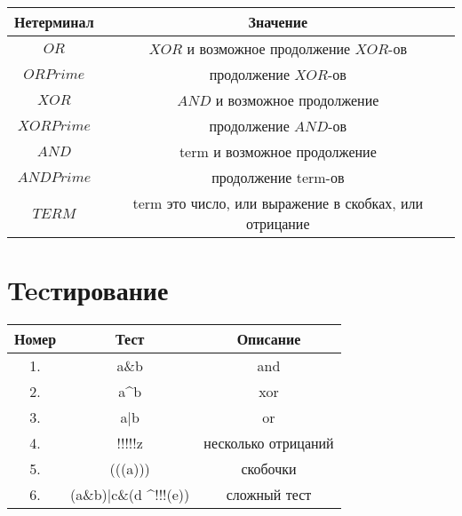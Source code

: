 \documentclass{article}
\begin{document}
\begin{center}
\begin{tabular}{ | c | c | }
    \hline
    Нетерминал    & Значение\\ \hline
    $OR$          &  $XOR$ и возможное продолжение $XOR$-ов       \\ \hline
    $ORPrime$     &  продолжение $XOR$-ов      \\ \hline

    $XOR$         &  $AND$ и возможное продолжение    \\ \hline
    $XORPrime$    &  продолжение $AND$-ов  \\ \hline

    $AND$         &  term и возможное продолжение    \\ \hline
    $ANDPrime$    &  продолжение term-ов     \\ \hline

    $TERM$        & term это число, или выражение в скобках, или отрицание  \\ \hline


\end{tabular}
\end{center}


\section {Tecтирование} 

\begin{center}
\begin{tabular}{ | c | c | c | }

    \hline
    Номер & Тест & Описание \\ \hline
    1. & a\&b  & and       \\ \hline
    2. & a\textasciicircum b  & xor       \\ \hline
    3. & a|b  & or       \\ \hline
    4. & !!!!!z   & несколько отрицаний \\ \hline
    5. & (((a)))  & скобочки \\ \hline
    6. & (a\&b)|c\&(d \textasciicircum !!!(e))& сложный тест  \\ \hline

\end{tabular}
\end{center}




\end{document}

